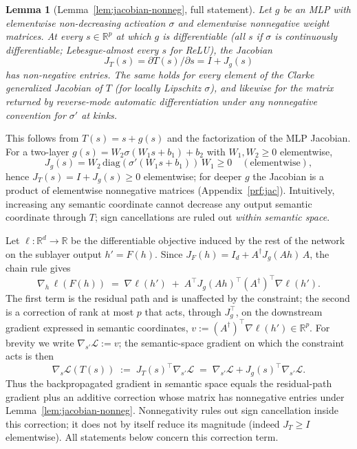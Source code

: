 \documentclass{article}
\theoremstyle{plain}
\theoremstyle{definition}
\theoremstyle{remark}
\theoremstyle{plain}
\newtheorem*{lemmastar}{Lemma}
\begin{document}
\begin{lemmastar}[Lemma~\ref{lem:jacobian-nonneg}, full statement]
Let $g$ be an MLP with elementwise non-decreasing activation $\sigma$ and
elementwise nonnegative weight matrices. At every $s \in \mathbb{R}^p$ at which $g$
is differentiable (all $s$ if $\sigma$ is continuously differentiable;
Lebesgue-almost every $s$ for ReLU), the Jacobian
\[
J_T(s) = \partial T(s)/\partial s = I + J_g(s)
\]
has non-negative entries. The same holds for every element of the Clarke
generalized Jacobian of $T$ (for locally Lipschitz $\sigma$), and likewise for the
matrix returned by reverse-mode automatic differentiation under any nonnegative
convention for $\sigma'$ at kinks.
\end{lemmastar}

This follows from $T(s)=s+g(s)$ and the factorization of the MLP Jacobian. For a
two-layer $g(s)=W_2\sigma(W_1 s + b_1)+b_2$ with $W_1,W_2\ge 0$ elementwise,
\[
J_g(s)=W_2\,\mathrm{diag}(\sigma'(W_1 s+b_1))\,W_1 \ge 0 \quad (\text{elementwise}),
\]
hence $J_T(s)=I + J_g(s)\ge 0$ elementwise; for deeper $g$ the Jacobian is a product
of elementwise nonnegative matrices (Appendix~\ref{prf:jac}).
Intuitively, increasing any semantic coordinate cannot decrease any output semantic
coordinate through $T$; sign cancellations are ruled out \emph{within semantic space}.

Let $\ell:\mathbb{R}^d\to\mathbb{R}$ be the differentiable objective induced by the
rest of the network on the sublayer output $h' = F(h)$. Since
$J_F(h) = I_d + A^\dagger J_g(Ah)\, A$, the chain rule gives
\[
\nabla_h\, \ell(F(h)) \;=\; \nabla \ell(h') \;+\; A^{\top} J_g(Ah)^{\top} (A^\dagger)^{\top} \nabla \ell(h').
\]
The first term is the residual path and is unaffected by the constraint; the second
is a correction of rank at most $p$ that acts, through $J_g^\top$, on the downstream
gradient expressed in semantic coordinates, $v := (A^\dagger)^{\top}\nabla \ell(h')
\in \mathbb{R}^p$. For brevity we write $\nabla_{s'}\mathcal{L} := v$; the
semantic-space gradient on which the constraint acts is then
\[
\nabla_s \mathcal{L}(T(s)) \;:=\; J_T(s)^\top \nabla_{s'} \mathcal{L}
\;=\; \nabla_{s'}\mathcal{L} + J_g(s)^\top \nabla_{s'}\mathcal{L}.
\]
Thus the backpropagated gradient in semantic space equals the residual-path gradient
plus an additive correction whose matrix has nonnegative entries under
Lemma~\ref{lem:jacobian-nonneg}. Nonnegativity rules out sign cancellation inside
this correction; it does not by itself reduce its magnitude (indeed $J_T \ge I$
elementwise). All statements below concern this correction term.
\end{document}
